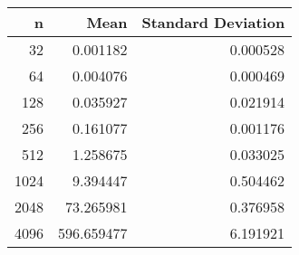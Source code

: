 \begin{tabular}{rrr}
\toprule
    n &        Mean &  Standard Deviation \\
\midrule
   32 &    0.001182 &            0.000528 \\
   64 &    0.004076 &            0.000469 \\
  128 &    0.035927 &            0.021914 \\
  256 &    0.161077 &            0.001176 \\
  512 &    1.258675 &            0.033025 \\
 1024 &    9.394447 &            0.504462 \\
 2048 &   73.265981 &            0.376958 \\
 4096 &  596.659477 &            6.191921 \\
\bottomrule
\end{tabular}
